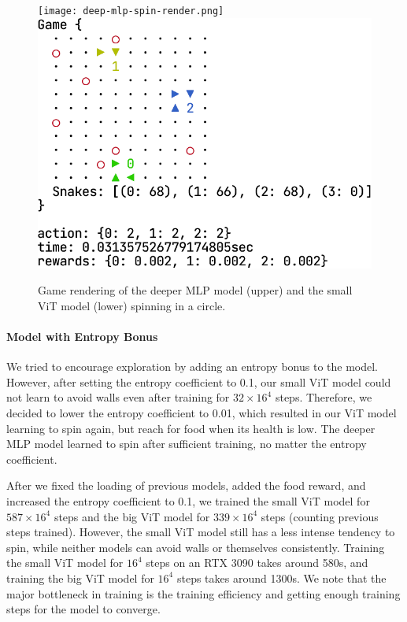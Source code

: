 \documentclass[conference]{IEEEtran}
\begin{document}
\begin{figure}
    \centering
    \texttt{[image: deep-mlp-spin-render.png]}\\[24pt]
    \includegraphics[width=\linewidth]{vit_spin_render.png}
    \caption{Game rendering of the deeper MLP model (upper)
        and the small ViT model (lower) spinning in a circle.
    }
    \label{fig:render}
\end{figure}

\paragraph{Model with Entropy Bonus}
We tried to encourage exploration by adding an entropy bonus to the model.
However, after setting the entropy coefficient to 0.1,
our small ViT model could not learn to avoid walls even after training for
$32\times 16^4$ steps. Therefore,
we decided to lower the entropy coefficient to 0.01,
which resulted in our ViT model learning to spin again,
but reach for food when its health is low.
The deeper MLP model learned to spin after sufficient training,
no matter the entropy coefficient.

After we fixed the loading of previous models, added the food reward,
and increased the entropy coefficient to 0.1,
we trained the small ViT model for $587\times 16^4$ steps and the big ViT model
for $339\times 16^4$ steps (counting previous steps trained). However,
the small ViT model still has a less intense tendency to spin,
while neither models can avoid walls or themselves consistently.
Training the small ViT model for $16^4$ steps on an RTX 3090 takes around 580s,
and training the big ViT model for $16^4$ steps takes around 1300s.
We note that the major bottleneck in training is the training efficiency and
getting enough training steps for the model to converge.
\end{document}
